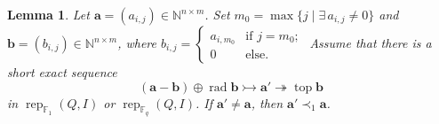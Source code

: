 \documentclass[12pt]{amsart}
\newtheorem{lemma}[theorem]{Lemma}
\theoremstyle{remark}
\theoremstyle{definition}
\numberwithin{equation}{section}
\begin{document}
\begin{lemma}\label{lem:order-relation-nakayama-F_1}
    Let $\mathbf{a}=(a_{i,j})\in \mathbb{N}^{n\times m}$. Set $m_0=\max\{j\mid \exists\, a_{i,j}\neq 0\}$ and $\mathbf{b}=(b_{i,j})\in \mathbb{N}^{n\times m}$, where $b_{i,j}=\begin{cases}
        a_{i,m_0} &\text{if $j=m_0$};\\
        0&\text{else}.
    \end{cases}$
    Assume that there is a short exact sequence \[(\mathbf{a}-\mathbf{b})\oplus \operatorname{rad}\mathbf{b}\rightarrowtail \mathbf{a}'\twoheadrightarrow \operatorname{top}\mathbf{b}\] 
    in $\operatorname{rep}_{\mathbb{F}_1}(Q,I)$ or $\operatorname{rep}_{\mathbb{F}_q}(Q,I)$.
    If $\mathbf{a}'\neq \mathbf{a}$, then $\mathbf{a}'\prec_{1}\mathbf{a}$.
\end{lemma}
\end{document}
